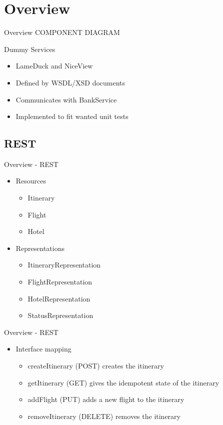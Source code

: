 
\section{Overview}
\begin{frame}{Overview}
COMPONENT DIAGRAM
\end{frame}


\begin{frame}{Dummy Services}
\begin{itemize}[<+->]
\item LameDuck and NiceView
\item Defined by WSDL/XSD documents
\item Communicates with BankService
\item Implemented to fit wanted unit tests
\end{itemize}
\end{frame}


\subsection{REST}
\begin{frame}{Overview - REST}
\begin{itemize}[<+->]
	
	\medskip\item Resources
	\begin{itemize}
		\item Itinerary
		\item Flight
		\item Hotel
	\end{itemize}
		
	\medskip\item Representations
	\begin{itemize}
		\item ItineraryRepresentation
		\item FlightRepresentation
		\item HotelRepresentation
		\item StatusRepresentation
	\end{itemize}

\end{itemize}
\end{frame}

\begin{frame}{Overview - REST}
\begin{itemize}[<+->]
		
	\medskip\item Interface mapping
	\begin{itemize}
		\item createItinerary (POST) creates the itinerary
		\item getItinerary (GET) gives the idempotent state of the itinerary
		\item addFlight (PUT) adds a new flight to the itinerary
		\item removeItinerary (DELETE) removes the itinerary
	\end{itemize}

\end{itemize}
\end{frame}


